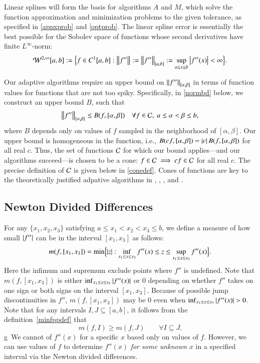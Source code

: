 \documentclass[review]{elsarticle}
\begin{document}
Linear splines will form the basis for algorithms $A$ and $M$, which solve the
function approximation and minimization problems to the given tolerance, as
specified in \eqref{appxprob} and \eqref{optprob}. The linear spline error is
essentially the best possible for the Sobolev space of functions whose second
derivatives have finite $L^{\infty}$-norm:
\[
\cw^{2,\infty}[a,b] : = \Bigl \{f \in C^1[a,b] : \norm{f''} : = \norm[{[a,b]}]{f''} : = \sup_{a \le x \le b} \abs{f''(x)} <  \infty \Bigr\}.
\]

Our adaptive algorithms require an upper bound on $\norm[{[\alpha,
\beta]}]{f''}$ in terms of function values for functions that are not too spiky.
Specifically, in \eqref{normbd} below, we construct an upper bound $B$, such that
\[
\norm[{[\alpha, \beta]}]{f''} \le B(f,[\alpha,\beta]) \quad \forall f \in \cc, \ a \le \alpha < \beta \le b,
\]
where $B$ depends only on values of $f$ sampled in the neighborhood of $[\alpha,
\beta]$. Our upper bound is homogeneous in the function, i.e.,
$B(cf,[\alpha,\beta]) = \abs{c} B(f,[\alpha,\beta])$ for all real $c$. Thus, the
set of functions $\cc$ for which our bound applies---and our algorithms
succeed---is chosen to be a cone: $f \in \cc \implies cf \in \cc$ for all real
$c$. The precise definition of $\cc$ is given below in \eqref{conedef}. Cones of
functions are key to the theoretically justified adpative algorithms in
\cite{HicEtal14b}, \cite{Ton14a}, \cite{Din15a}, and \cite{HicRazYun15a}.

\subsection{Newton Divided Differences} \label{sec:ndd}

For any $\{x_1, x_2, x_3\}$ satisfying $a \le x_1 < x_2 < x_3 \le b$, we define a
measure of how small $\abs{f''}$ can be in the interval $[x_1, x_3]$ as follows:
\begin{equation} \label{minfppdef}
m(f,[x_1, x_3]) = \min \Bigl\{ \abs{z}  : \inf_{x_1 \le x \le x_3} f''(x) \le z \le \sup_{x_1 \le x \le x_3} f''(x) \Bigr\}.
\end{equation}
Here the infimum and supremum exclude points where $f''$ is undefined. Note that
$m(f,[x_1, x_3])$ is either $ \inf_{x_1 \le x \le x_3} \abs{f''(x)}$ or $0$
depending on whether $f''$ takes on one sign or both signs on the interval
$[x_1, x_3]$. Because of possible jump discontinuities in $f''$, $m(f,[x_1,
x_3])$ may be $0$ even when $\inf_{x_1 \le x \le x_3} \abs{f''(x)} > 0$. Note
that for any intervals $I , J \subseteq [a,b]$, it follows from the definition~\eqref{minfppdef}
that
\begin{equation} \label{mdec}
m(f,I) \ge m(f,J) \qquad \forall I \subseteq J.
\end{equation}
 g\
We cannot of $f''(x)$ for a specific $x$ based only on values of $f$. However,
we can use values of $f$ to determine $f''(x)$ \emph{for some unknown $x$} in a
specified interval via the Newton divided differences.
\end{document}
